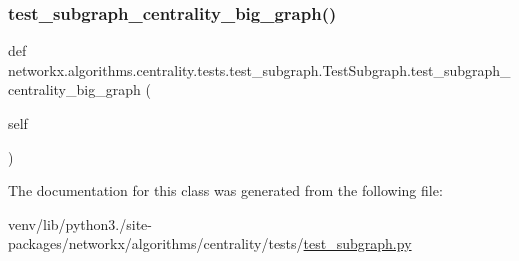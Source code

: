 \subsubsection{\texorpdfstring{test\+\_\+subgraph\+\_\+centrality\+\_\+big\+\_\+graph()}{test\_subgraph\_centrality\_big\_graph()}}
{\footnotesize\ttfamily def networkx.\+algorithms.\+centrality.\+tests.\+test\+\_\+subgraph.\+Test\+Subgraph.\+test\+\_\+subgraph\+\_\+centrality\+\_\+big\+\_\+graph (\begin{DoxyParamCaption}\item[{}]{self }\end{DoxyParamCaption})}



The documentation for this class was generated from the following file\+:\begin{DoxyCompactItemize}
\item 
venv/lib/python3./site-\/packages/networkx/algorithms/centrality/tests/\hyperlink{test__subgraph_8py}{test\+\_\+subgraph.\+py}\end{DoxyCompactItemize}
